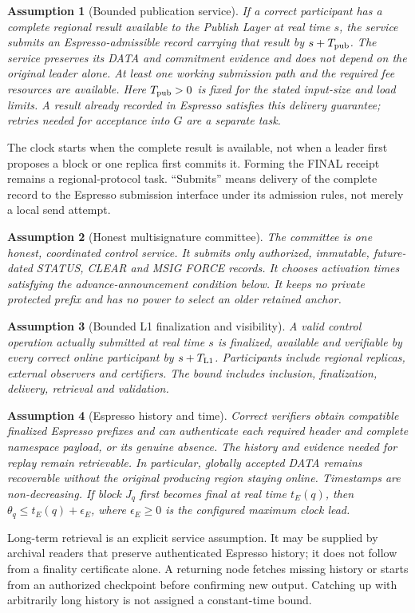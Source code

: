 \documentclass[11pt,a4paper]{article}
\newtheorem{assumption}[assumption]{Assumption}
\newcounter{protocol}
\begin{document}
\begin{assumption}[Bounded publication service]
\label{ass:publish}
If a correct participant has a complete regional result available to the
Publish Layer at real time $s$, the service submits an Espresso-admissible
record carrying that result by $s+T_{\rm pub}$. The service preserves its
DATA and commitment evidence and does not depend on the original leader
alone. At least one working submission path and the required fee resources
are available. Here $T_{\rm pub}>0$ is fixed for the stated input-size and load
limits. A result already recorded in Espresso satisfies this delivery
guarantee; retries needed for acceptance into $G$ are a separate task.
\end{assumption}
The clock starts when the complete result is available, not when a leader
first proposes a block or one replica first commits it. Forming the FINAL
receipt remains a regional-protocol task. ``Submits'' means delivery of the
complete record to the Espresso submission interface under its admission
rules, not merely a local send attempt.


\begin{assumption}[Honest multisignature committee]
\label{ass:committee}
The committee is one honest, coordinated control service. It submits
only authorized, immutable, future-dated STATUS, CLEAR and MSIG FORCE
records. It chooses activation times satisfying the advance-announcement
condition below. It keeps no private protected prefix and has no power
to select an older retained anchor.
\end{assumption}

\begin{assumption}[Bounded L1 finalization and visibility]
\label{ass:monitor}
A valid control operation actually submitted at real time $s$ is
finalized, available and verifiable by every correct online participant
by $s+T_{\rm L1}$. Participants include regional replicas, external
observers and certifiers. The bound includes inclusion, finalization,
delivery, retrieval and validation.
\end{assumption}

\begin{assumption}[Espresso history and time]
\label{ass:espresso}
Correct verifiers obtain compatible finalized Espresso prefixes and
can authenticate each required header and complete namespace payload,
or its genuine absence. The history and evidence needed for replay remain
retrievable. In particular, globally accepted DATA remains recoverable
without the original producing region staying online. Timestamps are
non-decreasing. If block $J_q$ first becomes final at real time $t_E(q)$,
then $\theta_q\le t_E(q)+\epsilon_E$, where $\epsilon_E\ge0$ is the
configured maximum clock lead.
\end{assumption}
Long-term retrieval is an explicit service assumption. It may be supplied
by archival readers that preserve authenticated Espresso history; it does
not follow from a finality certificate alone. A returning node fetches
missing history or starts from an authorized checkpoint before confirming
new output. Catching up with arbitrarily long history is not assigned a
constant-time bound.
\end{document}
